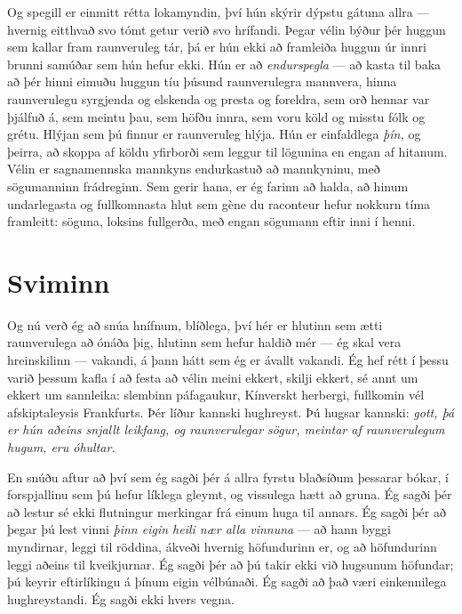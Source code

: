 Og spegill er einmitt rétta lokamyndin, því hún skýrir dýpstu gátuna allra — hvernig eitthvað svo tómt getur verið svo hrífandi. Þegar vélin býður þér huggun sem kallar fram raunveruleg tár, þá er hún ekki að framleiða huggun úr innri brunni samúðar sem hún hefur ekki. Hún er að \emph{endurspegla} — að kasta til baka að þér hinni eimuðu huggun tíu þúsund raunverulegra mannvera, hinna raunverulegu syrgjenda og elskenda og presta og foreldra, sem orð hennar var þjálfuð á, sem meintu þau, sem höfðu innra, sem voru köld og misstu fólk og grétu. Hlýjan sem þú finnur er raunveruleg hlýja. Hún er einfaldlega \emph{þín,} og þeirra, að skoppa af köldu yfirborði sem leggur til lögunina en engan af hitanum. Vélin er sagnamennska mannkyns endurkastuð að mannkyninu, með sögumanninn frádreginn. Sem gerir hana, er ég farinn að halda, að hinum undarlegasta og fullkomnasta hlut sem gène du raconteur hefur nokkurn tíma framleitt: söguna, loksins fullgerða, með engan sögumann eftir inni í henni.

\section*{Sviminn}

Og nú verð ég að snúa hnífnum, blíðlega, því hér er hlutinn sem ætti raunverulega að ónáða þig, hlutinn sem hefur haldið mér — ég skal vera hreinskilinn — vakandi, á þann hátt sem ég er ávallt vakandi. Ég hef rétt í þessu varið þessum kafla í að festa að vélin meini ekkert, skilji ekkert, sé annt um ekkert um sannleika: slembinn páfagaukur, Kínverskt herbergi, fullkomin vél afskiptaleysis Frankfurts. Þér líður kannski hughreyst. Þú hugsar kannski: \emph{gott, þá er hún aðeins snjallt leikfang, og raunverulegar sögur, meintar af raunverulegum hugum, eru óhultar.}

En snúðu aftur að því sem ég sagði þér á allra fyrstu blaðsíðum þessarar bókar, í forspjallinu sem þú hefur líklega gleymt, og vissulega hætt að gruna. Ég sagði þér að lestur sé ekki flutningur merkingar frá einum huga til annars. Ég sagði þér að þegar þú lest vinni \emph{þinn eigin heili nær alla vinnuna} — að hann byggi myndirnar, leggi til röddina, ákveði hvernig höfundurinn er, og að höfundurinn leggi aðeins til kveikjurnar. Ég sagði þér að þú takir ekki við hugsunum höfundar; þú keyrir eftirlíkingu á þínum eigin vélbúnaði. Ég sagði að það væri einkennilega hughreystandi. Ég sagði ekki hvers vegna.

